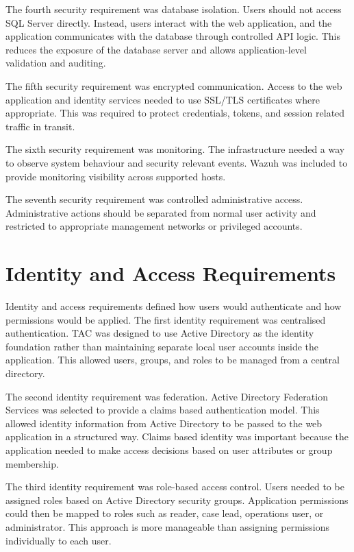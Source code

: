 The fourth security requirement was database isolation. Users should not access SQL Server directly. Instead, users interact with the web application, and the application communicates with the database through controlled API logic. This reduces the exposure of the database server and allows application-level validation and auditing.

The fifth security requirement was encrypted communication. Access to the web application and identity services needed to use SSL/TLS certificates where appropriate. This was required to protect credentials, tokens, and session related traffic in transit.

The sixth security requirement was monitoring. The infrastructure needed a way to observe system behaviour and security relevant events. Wazuh was included to provide monitoring visibility across supported hosts.

The seventh security requirement was controlled administrative access. Administrative actions should be separated from normal user activity and restricted to appropriate management networks or privileged accounts.


\section{Identity and Access Requirements}

Identity and access requirements defined how users would authenticate and how permissions would be applied. The first identity requirement was centralised authentication. TAC was designed to use Active Directory as the identity foundation rather than maintaining separate local user accounts inside the application. This allowed users, groups, and roles to be managed from a central directory.

The second identity requirement was federation. Active Directory Federation Services was selected to provide a claims based authentication model. This allowed identity information from Active Directory to be passed to the web application in a structured way. Claims based identity was important because the application needed to make access decisions based on user attributes or group membership.

The third identity requirement was role-based access control. Users needed to be assigned roles based on Active Directory security groups. Application permissions could then be mapped to roles such as reader, case lead, operations user, or administrator. This approach is more manageable than assigning permissions individually to each user.

